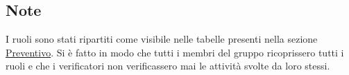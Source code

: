 \documentclass[a4paper, titlepage]{article}
\begin{document}
	\subsection{Note}
	I ruoli sono stati ripartiti come visibile nelle tabelle presenti nella sezione \hyperref[Preventivo]{Preventivo}. Si è fatto in modo che tutti i membri del gruppo ricoprissero tutti i ruoli e che i verificatori non verificassero mai le attività svolte da loro stessi.
	
	
\end{document}
